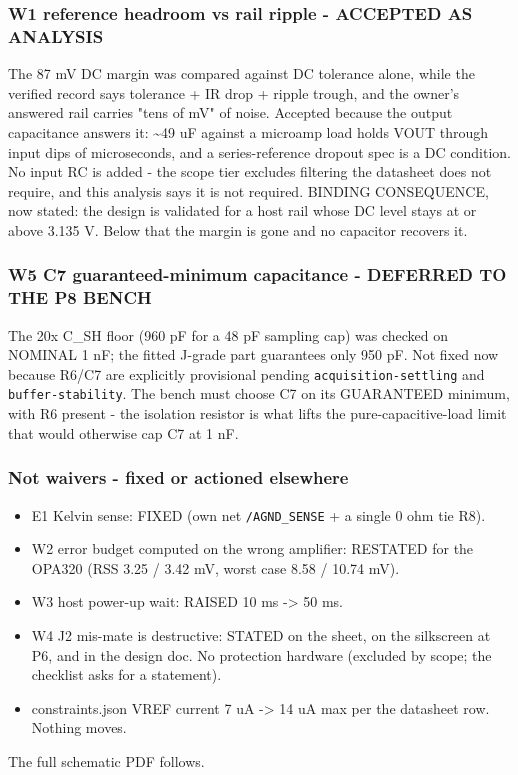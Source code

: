 \documentclass[11pt,a4paper]{article}
\begin{document}
\subsubsection*{W1 reference headroom vs rail ripple - ACCEPTED AS ANALYSIS}
The 87 mV DC margin was compared against DC tolerance alone, while the verified record says tolerance + IR drop + ripple trough, and the owner's answered rail carries "tens of mV" of noise. Accepted because the output capacitance answers it: \textasciitilde{}49 uF against a microamp load holds VOUT through input dips of microseconds, and a series-reference dropout spec is a DC condition. No input RC is added - the scope tier excludes filtering the datasheet does not require, and this analysis says it is not required. BINDING CONSEQUENCE, now stated: the design is validated for a host rail whose DC level stays at or above 3.135 V. Below that the margin is gone and no capacitor recovers it.

\subsubsection*{W5 C7 guaranteed-minimum capacitance - DEFERRED TO THE P8 BENCH}
The 20x C\_SH floor (960 pF for a 48 pF sampling cap) was checked on NOMINAL 1 nF; the fitted J-grade part guarantees only 950 pF. Not fixed now because R6/C7 are explicitly provisional pending \texttt{acquisition-settling} and \texttt{buffer-stability}. The bench must choose C7 on its GUARANTEED minimum, with R6 present - the isolation resistor is what lifts the pure-capacitive-load limit that would otherwise cap C7 at 1 nF.

\subsubsection*{Not waivers - fixed or actioned elsewhere}
\begin{itemize}
\item E1 Kelvin sense: FIXED (own net \texttt{/AGND\_SENSE} + a single 0 ohm tie R8).
\item W2 error budget computed on the wrong amplifier: RESTATED for the OPA320
(RSS 3.25 / 3.42 mV, worst case 8.58 / 10.74 mV).
\item W3 host power-up wait: RAISED 10 ms -\textgreater{} 50 ms.
\item W4 J2 mis-mate is destructive: STATED on the sheet, on the silkscreen at P6, and in
the design doc. No protection hardware (excluded by scope; the checklist asks for a
statement).
\item constraints.json VREF current 7 uA -\textgreater{} 14 uA max per the datasheet row. Nothing moves.
\end{itemize}
The full schematic PDF follows.

\end{document}
